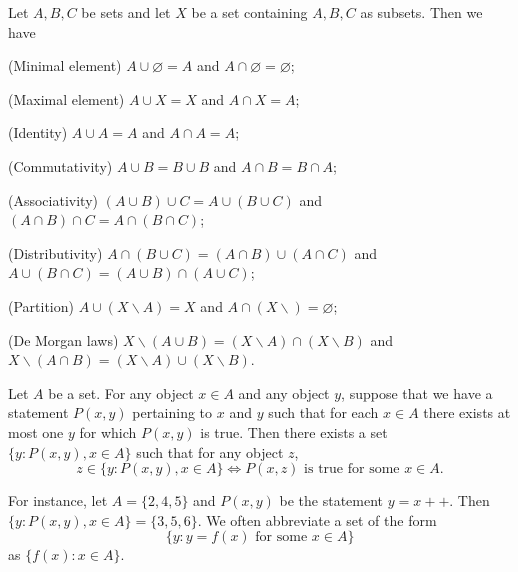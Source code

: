 \begin{prop}
Let $A, B, C$ be sets and let $X$ be a set containing $A, B, C$ as subsets. 
Then we have 
\begin{enumerate*}
    \item (Minimal element) $A \cup \varnothing = A$ and $A \cap \varnothing 
    = \varnothing$; 
    \item (Maximal element) $A \cup X = X$ and $A \cap X = A$; 
    \item (Identity) $A \cup A = A$ and $A \cap A = A$; 
    \item (Commutativity) $A \cup B = B \cup B$ and $A \cap B = B \cap A$; 
    \item (Associativity) $(A \cup B) \cup C = A \cup (B \cup C)$ and 
    $(A \cap B) \cap C = A \cap (B \cap C)$; 
    \item (Distributivity) $A \cap (B \cup C) = (A \cap B) \cup (A \cap C)$ 
    and $A \cup (B \cap C) = (A \cup B) \cap (A \cup C)$; 
    \item (Partition) $A \cup (X \backslash A) = X$ and 
    $A \cap (X \backslash) = \varnothing$; 
    \item (De Morgan laws) $X \backslash (A \cup B) = (X \backslash A) 
    \cap (X \backslash B)$ and $X \backslash (A \cap B) = (X \backslash A) 
    \cup (X \backslash B)$. 
\end{enumerate*}
\end{prop}

\begin{axiom}[Replacement]
\label{axiom:set_theory:replacement}
Let $A$ be a set. 
For any object $x \in A$ and any object $y$, suppose that we have a 
statement $P(x, y)$ pertaining to $x$ and $y$ such that for each $x \in A$ 
there exists at most one $y$ for which $P(x, y)$ is true. 
Then there exists a set $\{y: P(x, y), x \in A\}$ such that for any 
object $z$, 
\begin{equation*}
    z \in \{y: P(x, y), x \in A\} \iff 
    P(x, z) \text{ is true for some } x \in A. 
\end{equation*}
\end{axiom}

For instance, let $A = \{2, 4, 5\}$ and $P(x, y)$ be the statement $y = x++$. 
Then $\{y: P(x, y), x \in A\} = \{3, 5, 6\}$. 
We often abbreviate a set of the form 
\begin{equation*}
    \{y: y = f(x) \text{ for some } x \in A\}
\end{equation*}
as $\{f(x): x \in A\}$. 

